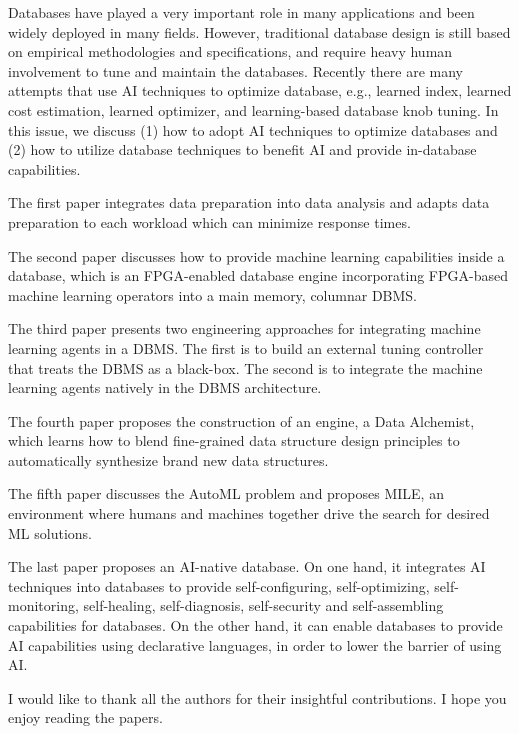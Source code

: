 \documentclass[11pt]{article}
\begin{document}
Databases have played a very important role in many applications and been widely deployed in many fields. However, traditional database design is still based on empirical methodologies and specifications,  and require heavy human involvement to tune and maintain the databases.   Recently there are many attempts that use AI techniques to optimize database, e.g., learned index, learned cost estimation, learned optimizer, and learning-based database knob tuning. In this issue, we discuss (1) how to adopt AI techniques to optimize databases and (2) how to utilize database techniques to benefit AI and provide in-database capabilities. 

The first paper integrates data preparation into data analysis and adapts data preparation to each workload which can minimize response times.

The second paper discusses how to provide machine learning capabilities inside a database, which is an FPGA-enabled database engine incorporating FPGA-based machine learning operators into a main memory, columnar DBMS. 


The third paper presents two engineering approaches for integrating machine learning agents in a DBMS. The first is to build an external tuning controller that treats the DBMS as a black-box. The second is to integrate the machine learning  agents natively in the DBMS architecture.  

The fourth paper proposes the construction of an engine, a Data Alchemist, which learns how to blend fine-grained data structure design principles to automatically synthesize brand new data structures.

The fifth paper discusses the AutoML problem and proposes MILE, an environment where humans and machines together drive the search for desired ML solutions. 

The last paper proposes an AI-native database. On one hand, it integrates AI techniques into databases to provide self-configuring, self-optimizing, self-monitoring, self-healing, self-diagnosis, self-security and self-assembling capabilities for databases. On the other hand, it can enable databases to provide AI capabilities using declarative languages, in order to lower the barrier of using AI.  



I would like to thank all the authors for their insightful contributions. I hope you enjoy reading the papers. 


\vspace{1em}
\end{document}
